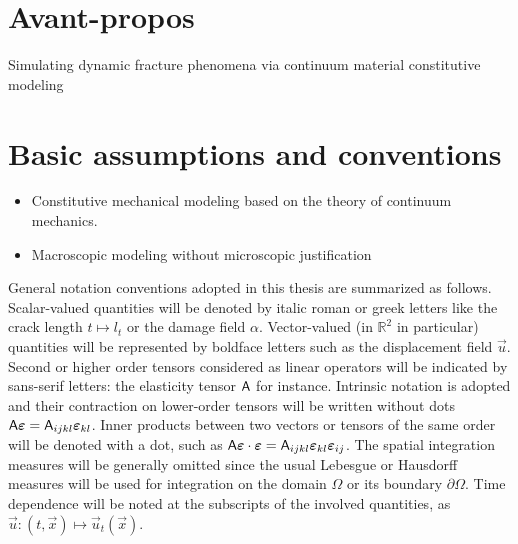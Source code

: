 \chapter{Avant-propos}
Simulating dynamic fracture phenomena via continuum material constitutive modeling


\chapter{Basic assumptions and conventions} \label{chap:basicassummtions}
\begin{itemize}
\item Constitutive mechanical modeling based on the theory of continuum mechanics.
\item Macroscopic modeling without microscopic justification
\end{itemize}

General notation conventions adopted in this thesis are summarized as follows. Scalar-valued quantities will be denoted by italic roman or greek letters like the crack length $t\mapsto l_t$ or the damage field $\alpha$. Vector-valued (in $\mathbb{R}^2$ in particular) quantities will be represented by boldface letters such as the displacement field $\vec{u}$. Second or higher order tensors considered as linear operators will be indicated by sans-serif letters: the elasticity tensor $\mathsf{A}$ for instance. Intrinsic notation is adopted and their contraction on lower-order tensors will be written without dots $\tens{A}\eps=\tens{A}_{ijkl}\eps_{kl}$. Inner products between two vectors or tensors of the same order will be denoted with a dot, such as $\tens{A}\eps\cdot\eps=\tens{A}_{ijkl}\eps_{kl}\eps_{ij}$. The spatial integration measures will be generally omitted since the usual Lebesgue or Hausdorff measures will be used for integration on the domain $\Omega$ or its boundary $\partial\Omega$. Time dependence will be noted at the subscripts of the involved quantities, as $\vec{u}:(t,\vec{x})\mapsto\vec{u}_t(\vec{x})$.